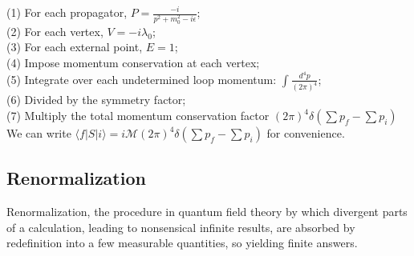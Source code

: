\documentclass{article}
\begin{document}
(1) For each propagator, $P = \frac{-i}{p^2 + m_0^2 -i\epsilon}$;\\
(2) For each vertex, $V = -i\lambda_0$;\\
(3) For each external point, $E=1$;\\
(4) Impose momentum conservation at each vertex;\\
(5) Integrate over each undetermined loop momentum: $\int \frac{d^4p}{(2\pi)^4}$;\\
(6) Divided by the symmetry factor;\\
(7) Multiply the total momentum conservation factor $(2\pi)^4 \delta(\sum p_f - \sum p_i)$ 
We can write $\langle f | S | i \rangle = i \mathcal{M} (2\pi)^4 \delta(\sum p_f - \sum p_i)$ for convenience.

\subsection{Renormalization}
Renormalization, the procedure in quantum field theory by which divergent parts of a calculation, leading to nonsensical infinite results, are absorbed by redefinition into a few measurable quantities, so yielding finite answers.
\end{document}
